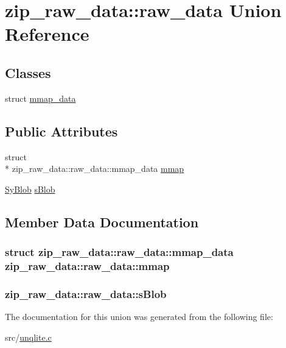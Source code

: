 \hypertarget{unionzip__raw__data_1_1raw__data}{\section{zip\-\_\-raw\-\_\-data\-:\-:raw\-\_\-data Union Reference}
\label{de/db7/unionzip__raw__data_1_1raw__data}
}
\subsection*{Classes}
\begin{DoxyCompactItemize}
\item 
struct \hyperlink{structzip__raw__data_1_1raw__data_1_1mmap__data}{mmap\-\_\-data}
\end{DoxyCompactItemize}
\subsection*{Public Attributes}
\begin{DoxyCompactItemize}
\item 
struct \\*
zip\-\_\-raw\-\_\-data\-::raw\-\_\-data\-::mmap\-\_\-data \hyperlink{unionzip__raw__data_1_1raw__data_a9062f369ea8bff3159f2b4139ae17b9f}{mmap}
\item 
\hyperlink{struct_sy_blob}{Sy\-Blob} \hyperlink{unionzip__raw__data_1_1raw__data_ad6482dc6561a986a64a69c7bb525715c}{s\-Blob}
\end{DoxyCompactItemize}


\subsection{Member Data Documentation}
\hypertarget{unionzip__raw__data_1_1raw__data_a9062f369ea8bff3159f2b4139ae17b9f}{
\subsubsection[{mmap}]{\setlength{\rightskip}{0pt plus 5cm}struct zip\-\_\-raw\-\_\-data\-::raw\-\_\-data\-::mmap\-\_\-data zip\-\_\-raw\-\_\-data\-::raw\-\_\-data\-::mmap}}\label{de/db7/unionzip__raw__data_1_1raw__data_a9062f369ea8bff3159f2b4139ae17b9f}
\hypertarget{unionzip__raw__data_1_1raw__data_ad6482dc6561a986a64a69c7bb525715c}{
\subsubsection[{s\-Blob}]{ zip\-\_\-raw\-\_\-data\-::raw\-\_\-data\-::s\-Blob}}\label{de/db7/unionzip__raw__data_1_1raw__data_ad6482dc6561a986a64a69c7bb525715c}


The documentation for this union was generated from the following file\-:\begin{DoxyCompactItemize}
\item 
src/\hyperlink{unqlite_8c}{unqlite.\-c}\end{DoxyCompactItemize}
